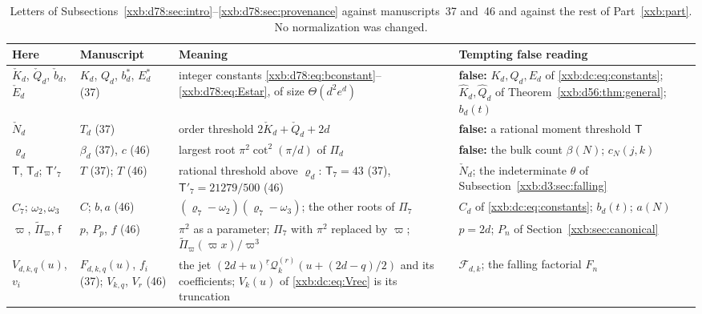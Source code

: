 \documentclass[11pt,a4paper]{article}
\numberwithin{equation}{section}
\theoremstyle{definition}
\theoremstyle{remark}
\theoremstyle{plain}
\newcommand{\fall}[2]{#1^{\underline{#2}}}
\begin{document}
\begingroup
\renewcommand{\thetable}{\thesection.B}%
\renewcommand{\theHtable}{xxb.d78.\thesection.B}%
\begin{table}[!htbp]
\centering\small
\caption{Letters of
Subsections~\ref{xxb:d78:sec:intro}--\ref{xxb:d78:sec:provenance} against
manuscripts~37 and~46 and against the rest of Part~\ref{xxb:part}.  No
normalization was changed.}\label{xxb:d78:tab:notation}
\begin{tabular}{@{}>{\raggedright\arraybackslash}p{}
 >{\raggedright\arraybackslash}p{}
 >{\raggedright\arraybackslash}p{}
 >{\raggedright\arraybackslash}p{}@{}}
\toprule
Here & Manuscript & Meaning & Tempting false reading\\
\midrule
$\check K_d$, $\check Q_d$, $\check b_d$, $\check E_d$ & $K_d$, $Q_d$, $b_d^*$, $E_d^*$ (37) & integer constants \eqref{xxb:d78:eq:bconstant}--\eqref{xxb:d78:eq:Estar}, of size $\Theta(d^2e^d)$ &
 \textbf{false:} $K_d,Q_d,E_d$ of \eqref{xxb:dc:eq:constants}; $\widehat K_d,\widehat Q_d$ of Theorem~\ref{xxb:d56:thm:general}; $b_d(t)$\\
$\check N_d$ & $T_d$ (37) & order threshold $2\check K_d+\check Q_d+2d$ & \textbf{false:} a rational moment threshold $\mathsf T$\\
$\varrho_d$ & $\beta_d$ (37), $c$ (46) & largest root $\pi^2\cot^2(\pi/d)$ of $\Pi_d$ & \textbf{false:} the bulk count $\beta(N)$; $c_N(j,k)$\\
$\mathsf T$, $\mathsf T_d$; $\mathsf T'_7$ & $T$ (37); $T$ (46) & rational threshold above $\varrho_d$: $\mathsf T_7=43$ (37), $\mathsf T'_7=21279/500$ (46) & $\check N_d$; the indeterminate $\theta$ of Subsection~\ref{xxb:d3:sec:falling}\\
\midrule
$\widehat C_7$; $\omega_2,\omega_3$ & $C$; $b,a$ (46) & $(\varrho_7-\omega_2)(\varrho_7-\omega_3)$; the other roots of $\Pi_7$ & $C_d$ of \eqref{xxb:dc:eq:constants}; $b_d(t)$; $a(N)$\\
$\varpi$, $\widetilde\Pi_\varpi$, $\mathsf f$ & $p$, $P_p$, $f$ (46) & $\pi^2$ as a parameter; $\Pi_7$ with $\pi^2$ replaced by $\varpi$; $\widetilde\Pi_\varpi(\varpi x)/\varpi^3$ & $p=2d$; $P_n$ of Section~\ref{xxb:sec:canonical}\\
$V_{d,k,q}(u)$, $v_i$ & $F_{d,k,q}(u)$, $f_i$ (37); $V_{k,q}$, $V_r$ (46) & the jet $\fall{(2d+u)}{r}\mathcal Q_k^{(r)}(u+(2d-q)/2)$ and its coefficients; $V_k(u)$ of \eqref{xxb:dc:eq:Vrec} is its truncation & $\mathcal F_{d,k}$; the falling factorial $F_n$\\

\end{tabular}
\end{table}
\end{document}
